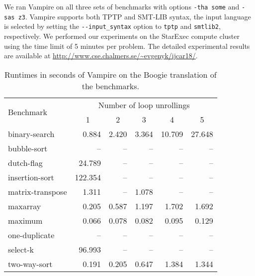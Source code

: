 We ran Vampire on all three sets of benchmarks with options \verb'-tha some' and \verb'-sas z3'. Vampire supports both TPTP and SMT-LIB syntax, the input language is selected by setting the \verb'--input_syntax' option to \verb'tptp' and \verb'smtlib2', respectively. We performed our experiments on the StarExec compute cluster~\cite{starexec} using the time limit of 5 minutes per problem. The detailed experimental results are available at \url{http://www.cse.chalmers.se/~evgenyk/ijcar18/}.

\begin{table}\center
  \caption{Runtimes in seconds of Vampire on the Boogie translation of the benchmarks.}
  \label{table:boogie/boogie-results}
  \begin{tabular}[t]{lrrrrr}
\hline
\multirow{2}{*}{Benchmark} & \multicolumn{5}{c}{Number of loop unrollings} \\ %
& \multicolumn{1}{c}{1} & \multicolumn{1}{c}{2} & \multicolumn{1}{c}{3} & \multicolumn{1}{c}{4} & \multicolumn{1}{c}{5} \\
\hline
binary-search    & 0.884 & 2.420 & 3.364 & 10.709 & 27.648 \\
bubble-sort      & -- & -- & -- & -- & -- \\
dutch-flag       & 24.789 & -- & -- & -- & -- \\
insertion-sort   & 122.354 & -- & -- & -- & -- \\
matrix-transpose & 1.311 & -- & 1.078 & -- & -- \\
maxarray         & 0.205 & 0.587 & 1.197 & 1.702 & 1.692 \\
maximum          & 0.066 & 0.078 & 0.082 & 0.095 & 0.129 \\
one-duplicate    & -- & -- & -- & -- & -- \\
select-k         & 96.993 & -- & -- & -- & -- \\
two-way-sort     & 0.191 & 0.205 & 0.647 & 1.384 & 1.344 \\
  \end{tabular}
\end{table}

